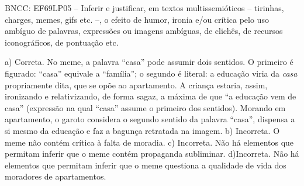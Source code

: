 \begin{enumerate}
BNCC: EF69LP05 -- Inferir e justificar, em textos multissemióticos --
tirinhas, charges, memes, gifs etc. --, o efeito de humor, ironia e/ou
crítica pelo uso ambíguo de palavras, expressões ou imagens ambíguas, de
clichês, de recursos iconográficos, de pontuação etc.

a) Correta. No meme, a palavra ``casa'' pode assumir dois sentidos. O primeiro
é figurado: ``casa'' equivale a ``família''; o segundo é literal: a educação
viria da \textit{casa} propriamente dita, que se opõe ao apartamento. A criança 
estaria, assim, ironizando e relativizando, de forma sagaz, a máxima de que 
``a educação vem de casa'' (expressão na qual ``casa'' assume o primeiro dos 
sentidos). Morando em apartamento, o garoto considera o segundo sentido da palavra
``casa'', dispensa a si mesmo da educação e faz a bagunça retratada na imagem.    
b) Incorreta. O meme não contém crítica à falta de moradia.
c) Incorreta. Não há elementos que permitam inferir que o meme contém propaganda 
subliminar. 
d)Incorreta. Não há elementos que permitam inferir que o meme questiona a qualidade 
de vida dos moradores de apartamentos.
\end{enumerate}


